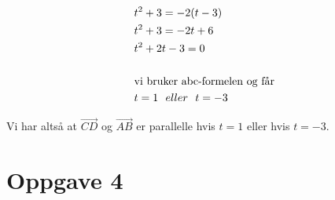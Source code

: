 \begin{easylist}[enumerate]
	\begin{equation*}
		\begin{aligned}
			&t^2 + 3  = -2(t-3)\\
			&t^2 + 3  = -2t + 6\\
			&t^2 +2t -3 = 0   \\ \\
			&\textnormal{vi bruker abc-formelen og får}\\
			&t = 1 \:\:\: eller \:\:\: t=-3
		\end{aligned}
	\end{equation*}
	
	Vi har altså at $\vec{CD}$ og $\vec{AB}$ er parallelle hvis $t = 1$ eller hvis $t = -3$.
	
\end{easylist}

\section*{Oppgave 4}
